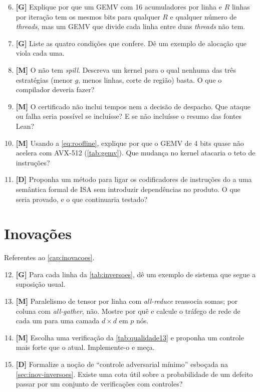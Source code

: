 \begin{enumerate}
  \setcounter{enumi}{5}
  \item \textbf{[G]} Explique por que um GEMV com 16 acumuladores por linha e $R$ linhas por iteração tem os mesmos bits para qualquer $R$ e qualquer número de \textit{threads}, mas um GEMV que divide cada linha entre duas \textit{threads} não tem.
  \item \textbf{[G]} Liste as quatro condições que  confere. Dê um exemplo de alocação que viola cada uma.
  \item \textbf{[M]} O \vapor{} não tem \textit{spill}. Descreva um kernel para o qual nenhuma das três estratégias (menor $g$, menos linhas, corte de região) basta. O que o compilador deveria fazer?
  \item \textbf{[M]} O certificado não inclui tempos nem a decisão de despacho. Que ataque ou falha seria possível se incluísse? E se não incluísse o resumo das fontes Lean?
  \item \textbf{[M]} Usando a \eqref{eq:roofline}, explique por que o GEMV de 4 bits quase não acelera com AVX-512 (\autoref{tab:gemv}). Que mudança no kernel atacaria o teto de instruções?
  \item \textbf{[D]} Proponha um método para ligar os codificadores de instruções do \vapor{} a uma semântica formal de ISA sem introduzir dependências no produto. O que seria provado, e o que continuaria testado?
\end{enumerate}

\section*{Inovações}
Referentes ao \autoref{cap:inovacoes}.


\begin{enumerate}
  \setcounter{enumi}{11}
  \item \textbf{[G]} Para cada linha da \autoref{tab:inversoes}, dê um exemplo de sistema que segue a suposição usual.
  \item \textbf{[M]} Paralelismo de tensor por linha com \textit{all-reduce} reassocia somas; por coluna com \textit{all-gather}, não. Mostre por quê e calcule o tráfego de rede de cada um para uma camada $d \times d$ em $p$ nós.
  \item \textbf{[M]} Escolha uma verificação da \autoref{tab:qualidade13} e proponha um controle mais forte que o atual. Implemente-o e meça.
  \item \textbf{[D]} Formalize a noção de ``controle adversarial mínimo'' esboçada na \autoref{sec:inov-inversoes}. Existe uma cota útil sobre a probabilidade de um defeito passar por um conjunto de verificações com controles?
\end{enumerate}

